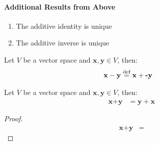 \documentclass[11pt]{report}
\begin{document}
\paragraph{Additional Results from Above}
\begin{enumerate}
    \item The additive identity is unique
    \item The additive inverse is unique
\end{enumerate}
\begin{definition}[Subtraction]
    Let $V$ be a vector space and $\textbf{x}, \textbf{y} \in V$, then:
    \begin{align*}
        \textbf{x} - \textbf{y} &\stackrel{\text{def}}{=} \textbf{x} + \textbf{-y}
    \end{align*}
\end{definition}
\begin{theorem}
    Let $V$ be a vector space and $\textbf{x}, \textbf{y} \in V$, then:
    \begin{align*}
        \textbf{x} + \textbf{y} &= \textbf{y} + \textbf{x}
    \end{align*} 
\end{theorem}
\begin{proof}
    \begin{align*}
        \textbf{x} + \textbf{y} &=  
    \end{align*}
\end{proof} 
\end{document}
